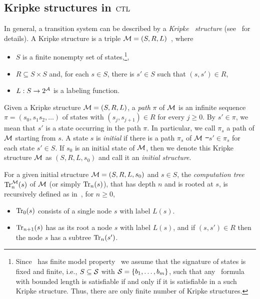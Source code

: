 \documentclass{article}
\begin{document}
\subsection{Kripke structures in $\textrm{CTL}$}
In general, a transition system
 can be described by a \emph{Kripke \ structure} (see~\cite{Baier:PMC:2008} for details). A Kripke structure is a triple ${\cal M}=(S,R,L)$~\cite{emerson1990temporal}, where
\begin{itemize}
  \item $S$ is a finite nonempty set of states,\footnote{Since \CTL\ has finite model property~\cite{DBLP:journals/jcss/EmersonH85} we assume that the signature of states
  is fixed and finite, i.e., $S\subseteq\cal S$ with ${\cal S}=\{b_1,\ldots,b_m\}$,
  such that any \CTL\ formula with bounded length is satisfiable if and only if it is satisfiable in a such Kripke structure. Thus, there are only finite number of Kripke structures. },
  	
  \item $R\subseteq S\times S$ and, for each $s\in S$, there
  is $s'\in S$ such that $(s,s')\in R$,
  \item $L: S\rightarrow 2^{\cal A}$ is a labeling function.
\end{itemize}

Given a Kripke structure ${\cal M}=(S,R,L)$, a \emph{path} $\pi$ of ${\cal M}$ is an infinite sequence
$\pi=(s_0, s_{1} s_{2},\dots)$ of states with
$(s_j, s_{j+1}) \in R$ for every $j\ge 0$.
By $s'\in \pi$, we mean that $s'$ is a state occurring in the path $\pi$.
In particular, we call $\pi_{s}$ %
a path of ${\cal M}$ starting  from $s$.
A state $s$ is {\em initial} if  there is a path $\pi_s$ of ${\cal M}$ \st\ $s'\in \pi_s$ for each state $s'\in S$.
If $s_0$ is an initial state of ${\cal M}$, then we denote this Kripke structure ${\cal M}$ as $(S,R,L,s_0)$ and call it an \emph{initial structure}.

For a given initial structure ${\cal M}=(S,R,L,s_0)$ and $s\in S$,
the {\em computation tree}
$\textrm{Tr}_n^{\cal M}(s)$ of $\cal M$ (or simply $\textrm{Tr}_n(s)$), that has depth $n$ and is rooted at $s$, is recursively defined as in~\cite{browne1988characterizing}, for $n\ge 0$,
\begin{itemize}
  \item $\textrm{Tr}_0(s)$ consists of a single node $s$ with label $L(s)$.
  \item $\textrm{Tr}_{n+1}(s)$ has as its root a node $s$ with label  $L(s)$, and
  if $(s,s')\in R$ then the node $s$ has a subtree $\textrm{Tr}_n(s')$.
\end{itemize}
\end{document}
